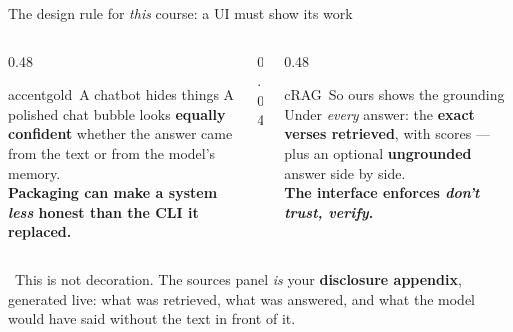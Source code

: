 \begin{frame}{The design rule for \emph{this} course: a UI must show its work}
  \begin{columns}[t, totalwidth=\textwidth]
    \begin{column}{0.48\textwidth}
      \begin{featbox}{accentgold}{\faEyeSlash\ A chatbot hides things}
        \scriptsize
        A polished chat bubble looks \textbf{equally confident} whether the answer came
        from the text or from the model's memory.
        \\[3pt]\textbf{Packaging can make a system \emph{less} honest than the CLI it replaced.}
      \end{featbox}
    \end{column}
    \begin{column}{0.04\textwidth}\end{column}
    \begin{column}{0.48\textwidth}
      \begin{featbox}{cRAG}{\faEye\ So ours shows the grounding}
        \scriptsize
        Under \emph{every} answer: the \textbf{exact verses retrieved}, with scores ---
        plus an optional \textbf{ungrounded} answer side by side.
        \\[3pt]\textbf{The interface enforces \emph{don't trust, verify}.}
      \end{featbox}
    \end{column}
  \end{columns}
  \vspace{8pt}
  \begin{calloutbox}[labnavy]
    \small\faFileSignature\ This is not decoration. The sources panel \emph{is} your
    \textbf{disclosure appendix}, generated live: what was retrieved, what was answered,
    and what the model would have said without the text in front of it.
  \end{calloutbox}
\end{frame}

